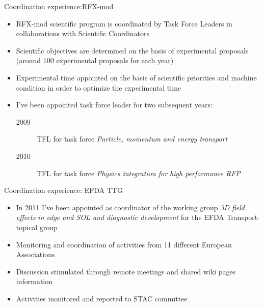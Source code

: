 \documentclass[t,10pt]{beamer}
\begin{document}
\begin{frame}{Coordination experience:RFX-mod}
\begin{itemize}[<+->]
\item RFX-mod scientific program is coordinated by Task Force Leaders in collaborations with
  Scientific Coordinators
\item Scientific objectives are determined on the basis of
  experimental proposals (around 100 experimental proposals for each year)
\item Experimental time appointed on the basis of scientific
  priorities and machine condition in order to optimize the
  experimental time
\item I've been appointed task force leader for two subsequent years:
  \begin{description}
  \item[2009] TFL for task force \emph{Particle, momentum and energy transport}
  \item[2010] TFL for task force \emph{Physics integration for high
      performance RFP}
  \end{description}
\end{itemize} 
\end{frame}


\begin{frame}{Coordination experience: EFDA TTG}
  \begin{itemize}[<+->]
\item In 2011 I've been appointed as coordinator of the working group
  \emph{3D field effects in edge and SOL and diagnostic development}
  for the EFDA Transport-topical group
\item Monitoring and coordination of activities from 11 different European Associations
\item Discussion stimulated through remote meetings and shared wiki
  pages information
\item Activities monitored and reported to STAC committee 
\end{itemize} 
\end{frame}
\end{document}

